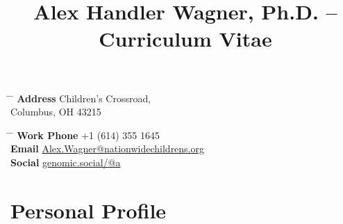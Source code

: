 \documentclass[10pt]{article} %
\begin{document}

\title{Alex Handler Wagner, Ph.D. -- Curriculum Vitae} %


\parbox{0.5\textwidth}{ %
\begin{tabbing} %
\hspace{3cm} \= \hspace{4cm} \= \kill %
{\bf Address}  Children's Crossroad,\\ %
\> Columbus, OH 43215 \\ %

\end{tabbing}}
\hfill %
\parbox{0.5\textwidth}{ %
\begin{tabbing} %
\hspace{3cm} \= \hspace{4cm} \= \kill %
{\bf Work Phone} \> +1 (614) 355 1645 \\ %
{\bf Email} \> \href{mailto:Alex.Wagner@nationwidechildrens.org}{Alex.Wagner@nationwidechildrens.org} \\ %
{\bf Social} \> \href{https://genomic.social/@a}{genomic.social/@a}
 
\end{tabbing}}


\section{Personal Profile}
\end{document}
